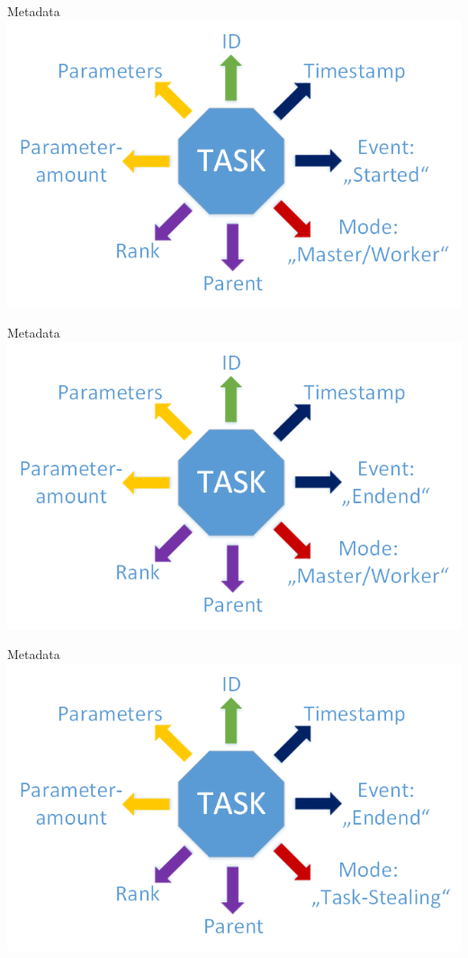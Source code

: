 	\begin{frame}{Metadata}
	\includegraphics[width=1.0\textwidth]{images/Task/Zeichnung2.png}
	\end{frame}
	
	\begin{frame}{Metadata}
	\includegraphics[width=1.0\textwidth]{images/Task/Zeichnung3.png}
	\end{frame}
	
	\begin{frame}{Metadata}
	\includegraphics[width=1.0\textwidth]{images/Zeichnungedited.png}
	\end{frame}
	
